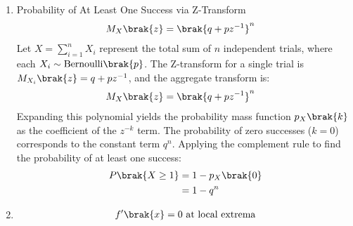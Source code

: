 \begin{enumerate}[label=\thesubsection.\arabic*, ref=\thesubsection.\theenumi]
	The event $Y = \lfloor X \rfloor = \ell$ strictly occurs when $X$ falls within the bounded interval $[\ell, \ell+1)$. The probability is derived by integrating the PDF over these boundaries:
	\begin{align}
		P\brak{Y = \ell} &= P\brak{\ell \le X < \ell + 1}
		\\
		&= \int_{\ell}^{\ell+1} \lambda e^{-\lambda x} \,dx
		\\
		&= \sbrak{-e^{-\lambda x}}_{\ell}^{\ell+1}
		\\
		&= e^{-\lambda \ell} - e^{-\lambda\brak{\ell+1}}
		\\
		&= e^{-\lambda \ell} \brak{1 - e^{-\lambda}}
		\intertext{By substituting $q = e^{-\lambda}$, the exact geometric probability mass function emerges:}
		P\brak{Y = \ell} &= q^\ell \brak{1 - q} \label{eq:DA2025-geom_pmf_q}
	\end{align}
	\item Probability of At Least One Success via Z-Transform
	\begin{align}
		M_X\brak{z} &= \brak{q + pz^{-1}}^n \label{eq:DA2025-binomial_z_transform}
	\end{align}
	Let $X = \sum_{i=1}^n X_i$ represent the total sum of $n$ independent trials, where each $X_i \sim \text{Bernoulli}\brak{p}$. The Z-transform for a single trial is $M_{X_i}\brak{z} = q + pz^{-1}$, and the aggregate transform is:
	\begin{align}
		M_X\brak{z} &= \brak{q + pz^{-1}}^n 
	\end{align}
	Expanding this polynomial yields the probability mass function $p_X\brak{k}$ as the coefficient of the $z^{-k}$ term. The probability of zero successes ($k=0$) corresponds to the constant term $q^n$. Applying the complement rule to find the probability of at least one success:
	\begin{align}
		P\brak{X \ge 1} &= 1 - p_X\brak{0}
		\\
		&= 1 - q^n \label{eq:DA2025-at_least_one}
	\end{align}
	\item 
	\begin{align}
		f'\brak{x} = 0 \text{ at local extrema} \label{eq:DA2025-extrema}
	\end{align}
	

\end{enumerate}
